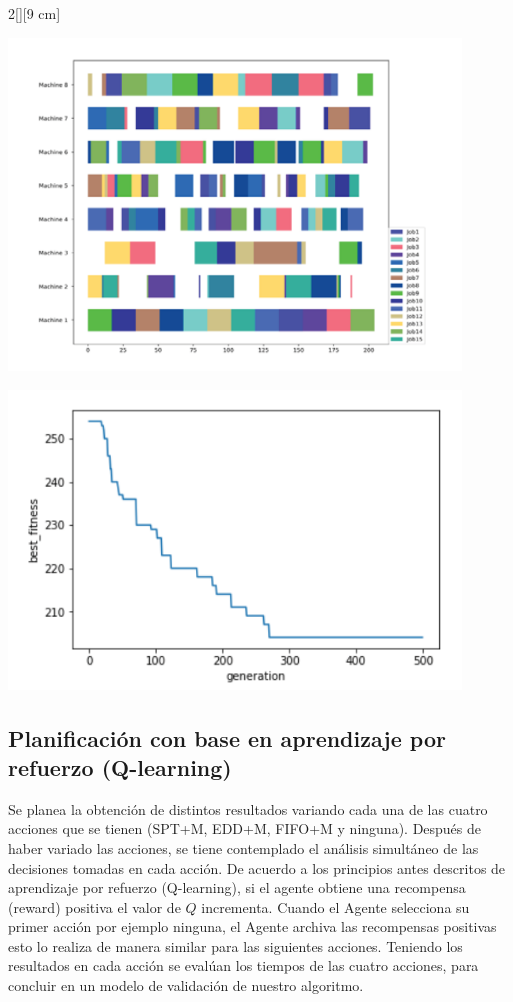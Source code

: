 \documentclass[letterpaper, 10 pt]{article}
\newenvironment{Figura}
{\par\medskip\noindent\minipage{\linewidth}}
{\endminipage\par\medskip}
\begin{document}
\begin{multicols}{2}[][9 cm]
\begin{Figura}
	\centering
	\includegraphics[width=0.9\textwidth]{GA-grafica.png}
	\label{fig:3}
\end{Figura}  

\begin{Figura}
	\centering
	\includegraphics[width=0.9\textwidth]{fitness-generation.png}
	\label{fig:4}
\end{Figura}  

\subsection{Planificación con base en aprendizaje por refuerzo (Q-learning)}

Se planea la obtención de distintos resultados variando cada una de las cuatro acciones que se tienen (SPT+M, EDD+M, FIFO+M y ninguna). Después de haber variado las acciones, se tiene contemplado el análisis simultáneo de las decisiones tomadas en cada acción. De acuerdo a los principios antes descritos de aprendizaje por refuerzo (Q-learning), si el agente obtiene una recompensa (reward) positiva el valor de $Q$ incrementa. Cuando el Agente selecciona su primer acción por ejemplo ninguna, el Agente archiva las recompensas positivas esto lo realiza de manera similar para las siguientes acciones. Teniendo los resultados en cada acción se evalúan los tiempos de las cuatro acciones, para concluir en un modelo de validación de nuestro algoritmo.


\end{multicols}
\end{document}
